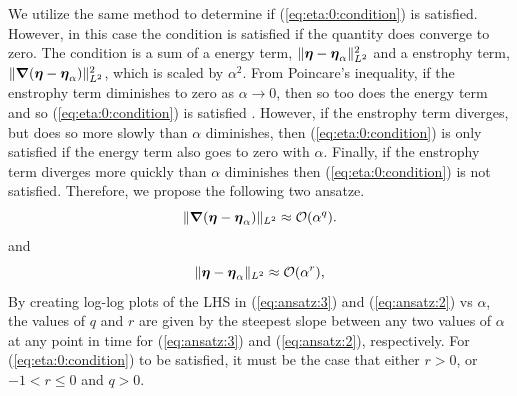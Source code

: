 We utilize the same method to determine if (\ref{eq:eta:0:condition}) is satisfied. However, in this case the condition is satisfied if the quantity does converge to zero. The condition is a sum of a energy term, $\|{\boldsymbol \eta}-{\boldsymbol \eta_\alpha}\|_{L^2}^2$ and a enstrophy term, $\|{\boldsymbol \nabla}({\boldsymbol \eta}-{\boldsymbol \eta_\alpha})\|_{L^2}^2$, which is scaled by $\alpha^2$. From Poincare's inequality, if the enstrophy term diminishes to zero as $\alpha\rightarrow 0$, then so too does the energy term and so (\ref{eq:eta:0:condition}) is satisfied \cite{doering_applied_1995}. However, if the enstrophy term diverges, but does so more slowly than $\alpha$ diminishes, then (\ref{eq:eta:0:condition}) is only satisfied if the energy term also goes to zero with $\alpha$. Finally, if the enstrophy term diverges more quickly than $\alpha$ diminishes then (\ref{eq:eta:0:condition}) is not satisfied. Therefore, we propose the following two ansatze.
\begin{equation}\label{eq:ansatz:3}
\|{\boldsymbol \nabla}({\boldsymbol \eta}-{\boldsymbol \eta_\alpha})\|_{L^2} \approx \mathcal{O}(\alpha^q).
\end{equation}
and
\begin{equation}\label{eq:ansatz:2}
\|{\boldsymbol \eta}-{\boldsymbol \eta_\alpha}\|_{L^2} \approx \mathcal{O}(\alpha^r),
\end{equation}
By creating log-log plots of the LHS in (\ref{eq:ansatz:3}) and (\ref{eq:ansatz:2}) vs $\alpha$, the values of $q$ and $r$ are given by the steepest slope between any two values of $\alpha$ at any point in time for (\ref{eq:ansatz:3}) and (\ref{eq:ansatz:2}), respectively. For (\ref{eq:eta:0:condition}) to be satisfied, it must be the case that either $r>0$, or $-1<r\leq 0$ and $q>0$.


